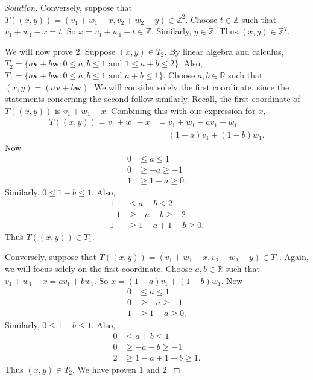 \documentclass[12pt]{article}
\newcommand{\Z}{\mathbb{Z}}
\newcommand{\R}{\mathbb{R}}
\newenvironment{exercise}[2][Exercise]{\begin{trivlist}
        \item[\hskip \labelsep {\bfseries #1}\hskip \labelsep {\bfseries #2.}]}{\end{trivlist}}
\newenvironment{solution}
        {\begin{proof}[Solution]}
                    {\end{proof}}
\begin{document}
\begin{exercise}{42}
\begin{solution}
        Conversely, suppose that \( T((x , y)) = (v_{1} + w_{1} - x , v_{2} + w_{2} - y) \in \Z^{2} . \) Choose \( t \in \Z \) such that \( v_{1} + w_{1} - x = t. \) So \( x = v_{1} + w_{1} -t \in \Z. \) Similarly, \( y \in \Z. \) Thus \( (x ,y) \in \mathbb{Z}^{2} \).

        We will now prove 2. Suppose \( (x , y) \in T_{2} . \) By linear algebra and calculus, \( T_{2} = \{a \mathbf{v} + b \mathbf{w} : 0 \leq a,b \leq 1 \text{ and } 1 \leq a + b \leq 2\} . \) Also, \( T_{1} = \{a \mathbf{v} + b \mathbf{w} : 0 \leq a,b \leq 1 \text{ and } a + b \leq 1\} . \)  Choose \( a,b \in \R \) such that \( (x,y) = (a \mathbf{v} + b\mathbf{w}) . \) We will consider solely the first coordinate, since the statements concerning the second follow similarly. Recall, the first coordinate of \( T((x,y)) \) is \( v_{1} + w_{1} - x. \) Combining this with our expression for \( x, \)
        \begin{align*}
            T((x,y)) = v_{1} + w_{1} - x &= v_{1} + w_{1} - a v_{1} + w_{1}\\
            &= (1-a) v_{1} + (1-b) w_{1} .
        \end{align*}
        Now
        \begin{align*}
            0 &\leq a \leq 1\\
            0 &\geq -a \geq -1\\
            1 &\geq 1-a \geq 0.
        \end{align*}
        Similarly, \( 0 \leq 1-b \leq 1. \) Also,
        \begin{align*}
            1 &\leq a + b \leq 2\\
            -1 &\geq -a -b \geq -2\\
            1 &\geq 1-a + 1 - b \geq 0.
        \end{align*}
        Thus \( T((x , y)) \in T_{1} . \)

        Conversely, suppose that \( T((x,y)) = (v_{1} + w_{1} - x, v_{2} + w_{2} - y) \in T_{1} . \) Again, we will focus solely on the first coordinate. Choose \( a,b \in \mathbb{R} \) such that \( v_{1} + w_{1} - x = a v_{1} + b w_{1} . \) So \( x = (1-a) v_{1} + (1-b) w_{1} . \) Now
        \begin{align*}
            0 &\leq a \leq 1\\
            0 &\geq -a \geq -1\\
            1 &\geq 1-a \geq 0.
        \end{align*}
        Similarly, \( 0 \leq 1-b \leq 1. \) Also,
        \begin{align*}
            0 &\leq a + b \leq 1\\
            0 &\geq -a -b \geq -1\\
            2 &\geq 1-a + 1 - b \geq 1.
        \end{align*}
        Thus \( (x,y) \in T_{2} . \) We have proven 1 and 2.


\end{solution}
\end{exercise}
\end{document}
